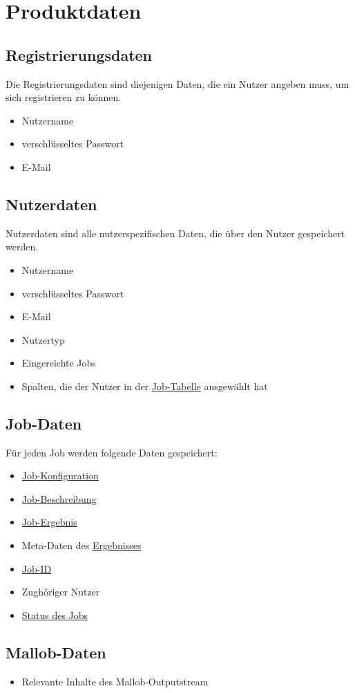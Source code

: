 
\section{Produktdaten}
\label{PD}

\label{PD:Registrierungsdaten}
\subsection{Registrierungsdaten}
Die Registrierungsdaten sind diejenigen Daten, die ein Nutzer angeben muss, um sich registrieren zu können. 
\begin{itemize}[noitemsep]
    \item Nutzername
    \item verschlüsseltes Passwort
    \item E-Mail
\end{itemize}

\label{PD:Nutzerdaten}
\subsection{Nutzerdaten}
Nutzerdaten sind alle nutzerspezifischen Daten, die über den Nutzer gespeichert werden.
\begin{itemize}[noitemsep]
    \item Nutzername
    \item verschlüsseltes Passwort
    \item E-Mail
    \item Nutzertyp
    \item Eingereichte Jobs 
    \item Spalten, die der Nutzer in der \hyperref[pages:job-table]{Job-Tabelle} ausgewählt hat
\end{itemize}



\subsection{Job-Daten}
Für jeden Job werden folgende Daten gespeichert:
\begin{itemize}[noitemsep]
    \item \hyperref[B:Job-Konfiguration]{Job-Konfiguration}
    \item \hyperref[B:Job-Beschreibung]{Job-Beschreibung}
    \item \hyperref[B:Job-Ergebnis]{Job-Ergebnis}
    \item Meta-Daten des \hyperref[B:Job-Ergebnis]{Ergebnisses}
    \item \hyperref[B:Job-ID]{Job-ID}
    \item Zughöriger Nutzer
    \item \hyperref[B:Job-Status]{Status des Jobs}
\end{itemize}

\subsection{\gls{Mallob}-Daten}
\begin{itemize}
    \item Relevante Inhalte des \gls{Mallob}-Outputstream
\end{itemize}
